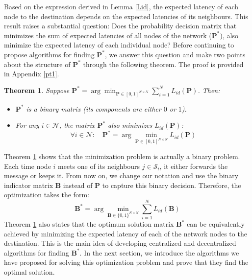 \documentclass[journal,onecolumn,11pt]{IEEEtran}
\theoremstyle{plain}
\newtheorem{theorem}{Theorem}
\theoremstyle{definition}
\def\bP{{\mathbf P}}
\begin{document}
Based on the expression derived in Lemma \ref{Lid}, the expected latency of each node to the destination depends on the expected latencies of its neighbours. This result raises a substantial question: Does the probability decision  matrix that minimizes the sum of expected latencies of all nodes of the network ($\mathbf{P}^*$), also minimize the expected latency of each individual node? Before continuing to propose algorithms for finding $\mathbf{P}^*$,
we answer this question and make two points about the structure of $\mathbf{P}^*$ through the
following theorem. The proof is provided in Appendix \ref{pt1}.
\begin{theorem}\label{theorem1}
Suppose $\mathbf{P}^*= \arg \min_{\bP \in {[0,1]}^{N\times N}} \sum_{i=1}^N L_{id}(\mathbf{P})$. Then:
\begin{itemize}
\item[(1)] $\mathbf{P}^*$ is a binary matrix (its components are either $0$ or $1$).
\item[(2)] For any $i \in \mathcal{N}$, the matrix $ \mathbf{P}^*$ also
  minimizes $L_{id}(\mathbf{P})$: 
\begin{equation} \label{opt_node}
\forall i \in \mathcal{N}:  \quad   \mathbf{P}^*= \arg \min_{\bP \in {[0,1]}^{N\times N}} L_{id}(\mathbf{P})
\end{equation}
\end{itemize}
\end{theorem}

Theorem \ref{theorem1} shows that the minimization problem is actually a binary problem. Each time node $i$ meets one of its neighbours $j\in \mathcal{S}_i$, it either forwards the message or keeps it. From now on, we change our notation and use the binary indicator matrix $\mathbf{B}$ instead of $\mathbf{P}$ to capture this binary decision. Therefore, the optimization takes the form:
\begin{equation}\label{opt}
\mathbf{B}^*= \arg \min_{\mathbf{B} \in \{0,1\}^{N \times N}} \sum_{i=1}^N L_{id}(\mathbf{B})
\end{equation}
Theorem \ref{theorem1} also states that the optimum solution matrix $\mathbf{B}^*$ can be equivalently achieved by minimizing the expected latency of each of the network nodes to the destination. This is the main idea of developing centralized and decentralized algorithms for finding $\mathbf{B}^*$. In the next section, we introduce the algorithms we have proposed for solving this optimization problem and prove that they find the optimal solution.
\end{document}
